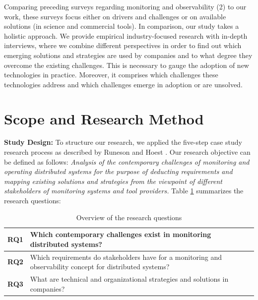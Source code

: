 \documentclass[runningheads]{llncs}
\begin{document}
Comparing preceding surveys regarding monitoring and observability (2) to our work, these surveys focus either on drivers and challenges or on available solutions (in science and commercial tools).
In comparison, our study takes a holistic approach. We provide empirical industry-focused research with in-depth interviews, where we combine different perspectives in order to find out which emerging solutions and strategies are used by companies and to what degree they overcome the existing challenges.
This is necessary to gauge the adoption of new technologies in practice. Moreover, it comprises which challenges these technologies address and which challenges emerge in adoption or are unsolved.




\section{Scope and Research Method}
\label{Scope and Research Method}

\textbf{Study Design:}
To structure our research, we applied the five-step case study research process as described by Runeson and Hoest \cite{Runeson2008}. Our research objective can be defined as follows: \textit{Analysis of the contemporary challenges of monitoring and operating distributed systems for the purpose of deducting requirements and mapping existing solutions and strategies from the viewpoint of different stakeholders of monitoring systems and tool providers.} Table \ref{tab:tableResearchQuestion} summarizes the research questions:\\

\begin{table}[h!]
\scriptsize
  \begin{center}
    \caption{Overview of the research questions}
    \label{tab:tableResearchQuestion}
    \begin{tabular}{  m{1cm}  m{8cm}  }
      \hline
      \textbf{RQ1} & Which contemporary challenges exist in monitoring distributed systems? \\
      \hline
      \textbf{RQ2} & Which requirements do stakeholders have for a monitoring and observability concept for distributed systems? \\
      \hline
      \textbf{RQ3} & What are technical and organizational strategies and solutions in companies? \\
      \hline
    \end{tabular}
  \end{center}
\end{table}
\end{document}
